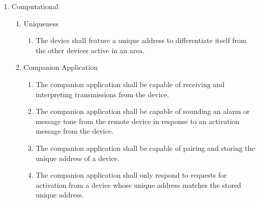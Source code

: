 \documentclass[twoside]{article}
\begin{document}
\begin{enumerate}
\begin{enumerate}
\begin{enumerate}
    \item If a communication standard is only supported by operating systems later than iOS 4.0 or Android 2.2 (Codename ``Froyo''), the design documentation must specify the minimum version supported.

    \item The device shall connect\footnote{Capable of both transmission and reception of data.} to the remote device over an unobstructed linear distance of 20 feet (6.1 meters).

    \end{enumerate}

  \item Computational

    \begin{enumerate}

    \item Uniqueness
      \begin{enumerate}

      \item The device shall feature a unique address to differentiate itself from the other devices active in an area.

      \end{enumerate}


    \item Companion Application
      \begin{enumerate}

      \item The companion application shall be capable of receiving and interpreting transmissions from the device.

      \item The companion application shall be capable of sounding an alarm or message tone from the remote device in response to an activation message from the device.

      \item The companion application shall be capable of pairing and storing the unique address of a device.

      \item The companion application shall only respond to requests for activation from a device whose unique address matches the stored unique address.

      \end{enumerate}

    \end{enumerate}

  \end{enumerate}

\end{enumerate}
\end{document}
